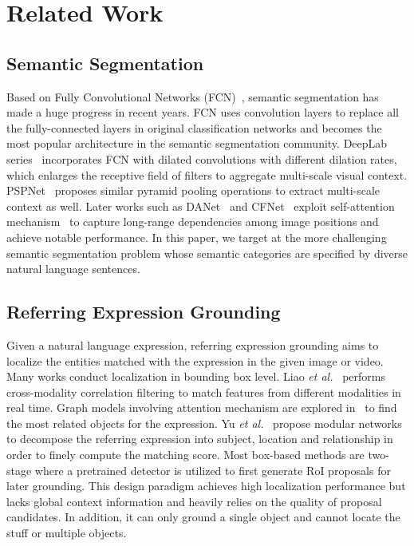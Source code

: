 \documentclass[10pt,journal,cspaper,compsoc]{IEEEtran}
\begin{document}
\section{Related Work}
\subsection{Semantic Segmentation}
Based on Fully Convolutional Networks (FCN)~\cite{long2015fully}, semantic segmentation has made a huge progress in recent years. 
FCN uses convolution layers to replace all the fully-connected layers in original classification networks and becomes the most popular architecture in the semantic segmentation community. 
DeepLab series~\cite{chen2014semantic}\cite{chen2017deeplab}\cite{chen2017rethinking} 
incorporates FCN with dilated convolutions with different dilation rates, which enlarges the receptive field of filters to aggregate multi-scale visual context. 
PSPNet~\cite{zhao2017pyramid} proposes similar pyramid pooling operations to extract 
multi-scale context as well. Later works such as DANet~\cite{fu2019dual} and 
CFNet~\cite{zhang2019co} exploit self-attention mechanism~\cite{wang2018non} to 
capture long-range dependencies among image positions and achieve notable performance. 
In this paper, we target at the more challenging semantic segmentation problem whose semantic categories are specified by diverse natural language sentences.

\subsection{Referring Expression Grounding}
Given a natural language expression, referring expression grounding aims to localize the entities matched with the expression in the given image or video. 
Many works conduct localization in bounding box level. 
Liao \textit{et al.}~\cite{liao2019real} performs cross-modality correlation filtering to match features from different modalities in real time. 
Graph models involving attention mechanism are explored in~\cite{yang2019cross}\cite{yang2019dynamic}\cite{yang2020graph}\cite{yang2020relationship} to find the most related objects for the expression. 
Yu \textit{et al.}~\cite{yu2018mattnet} propose modular networks to decompose the referring expression into subject, location and relationship in order to finely compute the matching score. 
Most box-based methods are two-stage where a pretrained detector is utilized to first generate RoI proposals for later grounding. This design paradigm achieves high localization performance but lacks global context information and heavily relies on the quality of proposal candidates. 
In addition, it can only ground a single object and cannot locate the stuff or multiple objects.
\end{document}
